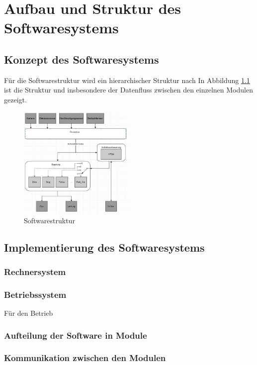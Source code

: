 \chapter{Aufbau und Struktur des Softwaresystems}

\section{Konzept des Softwaresystems}
Für die Softwarestruktur wird ein hierarchischer Struktur nach \cite{}
In Abbildung \ref{SOF:STR} ist die Struktur und insbesondere der Datenfluss zwischen den einzelnen Modulen gezeigt.

\FloatBarrier
\begin{figure}[t]
  \centering
  \includegraphics[width=0.5\textwidth]{images/Verhaltenssteuerung/SW_Structure.JPG}
  \caption{Softwarestruktur}
  \label{SOF:STR}
\end{figure}
\FloatBarrier

\section{Implementierung des Softwaresystems}
\subsection{Rechnersystem}

\subsection{Betriebssystem}
Für den Betrieb 
\subsection{Aufteilung der Software in Module}
\subsection{Kommunikation zwischen den Modulen}

